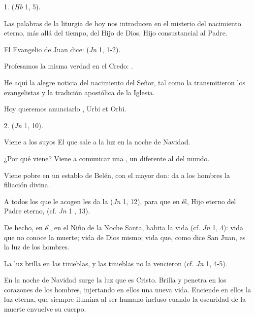 				\begin{body}
					1.  (\emph{Hb} 1, 5).
					
					Las palabras de la liturgia de hoy nos introducen en el misterio del nacimiento eterno, más allá del tiempo, del Hijo de Dios, Hijo consustancial al Padre.
					
					El Evangelio de Juan dice:  (\emph{Jn} 1, 1-2).
					
					Profesamos la misma verdad en el Credo: .
					
					He aquí la alegre noticia del nacimiento del Señor, tal como la transmitieron los evangelistas y la tradición apostólica de la Iglesia.
					
					Hoy queremos anunciarlo , Urbi et Orbi.
					
					2.  (\emph{Jn} 1, 10).
					
					Viene a los suyos El que sale a la luz en la noche de Navidad.
					
					¿Por qué viene? Viene a comunicar una , un  diferente al del mundo.
					
					Viene pobre en un establo de Belén, con el mayor don: da a los hombres la filiación divina.
					
					A todos los que le acogen les da la  (\emph{Jn} 1, 12), para que en él, Hijo eterno del Padre eterno,  (cf. \emph{Jn} 1 , 13).
					
					De hecho, en él, en el Niño de la Noche Santa, habita la vida (cf. \emph{Jn} 1, 4): vida que no conoce la muerte; vida de Dios mismo; vida que, como dice San Juan, es la luz de los hombres.
					
					La luz brilla en las tinieblas, y las tinieblas no la vencieron (cf. \emph{Jn} 1, 4-5).
					
					En la noche de Navidad surge la luz que es Cristo. Brilla y penetra en los corazones de los hombres, injertando en ellos una nueva vida. Enciende en ellos la luz eterna, que siempre ilumina al ser humano incluso cuando la oscuridad de la muerte envuelve su cuerpo.
					

\end{body}
